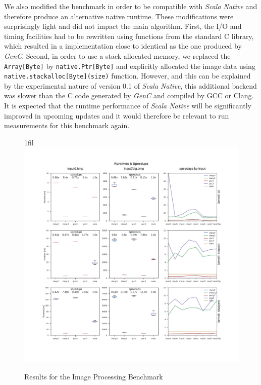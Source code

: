\documentclass[a4paper,twoside]{article}
\makeatletter
\newcommand{\InlineS}[1]{\lstinline[language=Leon]|#1|}
\newcommand*{\centerfloat}{%
  \parindent \z@
  \leftskip \z@ \@plus 1fil \@minus \textwidth
  \rightskip\leftskip
  \parfillskip \z@skip}
\newcommand{\GenC}{\emph{GenC}\xspace}
\makeatother
\begin{document}
We also modified the benchmark in order to be compatible with \emph{Scala
Native}\cite{scala_native} and therefore produce an alternative native runtime.
These modifications were surprisingly light and did not impact the main
algorithm. First, the I/O and timing facilities had to be rewritten using
functions from the standard C library, which resulted in a implementation close
to identical as the one produced by \GenC. Second, in order to use a stack
allocated memory, we replaced the \InlineS{Array[Byte]} by
\InlineS{native.Ptr[Byte]} and explicitly allocated the image data using
\InlineS{native.stackalloc[Byte](size)} function. However, and this can be
explained by the experimental nature of version 0.1 of \emph{Scala Native}, this
additional backend was slower than the C code generated by \GenC and compiled by
GCC or Clang. It is expected that the runtime performance of \emph{Scala Native}
will be significantly improved in upcoming updates and it would therefore be
relevant to run measurements for this benchmark again.


\begin{figure}[!h]
  \centerfloat
  \includegraphics[width=1.25\textwidth]{res/improc_results.pdf}
  \caption{Results for the Image Processing Benchmark}
  \label{fig:improc-res}
\end{figure}
\end{document}
